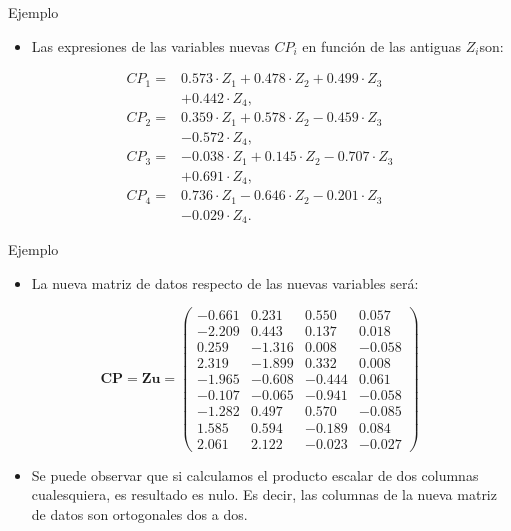 \documentclass[
  ignorenonframetext,
]{beamer}
\providecommand{\tightlist}{%
  \setlength{\itemsep}{0pt}\setlength{\parskip}{0pt}}
\begin{document}
\begin{frame}{Ejemplo}
\protect\hypertarget{ejemplo-13}{}
\begin{itemize}
\tightlist
\item
  Las expresiones de las variables nuevas \(CP_i\) en función de las
  antiguas \(Z_i\)son:
\end{itemize}

\[
\begin{array}{rl}
CP_1 = & 0.573\cdot Z_1 +0.478\cdot Z_2 +0.499\cdot Z_3\\ & +0.442 \cdot Z_4,
\\
CP_2 = & 0.359\cdot Z_1 + 0.578\cdot Z_2 -0.459 \cdot Z_3 \\ & -0.572 \cdot Z_4,
\\
CP_3 = & -0.038\cdot Z_1 +0.145 \cdot Z_2 -0.707\cdot Z_3 \\ &+0.691\cdot Z_4,
\\
CP_4 = & 0.736 \cdot Z_1 - 0.646\cdot Z_2 - 0.201\cdot Z_3 \\ & - 0.029 \cdot
Z_4.
\end{array}
\]
\end{frame}

\begin{frame}{Ejemplo}
\protect\hypertarget{ejemplo-14}{}
\begin{itemize}
\tightlist
\item
  La nueva matriz de datos respecto de las nuevas variables será:
\end{itemize}

\[
\mathbf{CP} = \mathbf{Z} \mathbf{u} =
\begin{pmatrix}
-0.661 & 0.231 & 0.550 & 0.057 \\
 -2.209 & 0.443 & 0.137 & 0.018 \\
 0.259 & -1.316 & 0.008 & -0.058 \\
 2.319 & -1.899 & 0.332 & 0.008 \\
 -1.965 & -0.608 & -0.444 & 0.061 \\
 -0.107 & -0.065 & -0.941 & -0.058 \\
 -1.282 & 0.497 & 0.570 & -0.085 \\
 1.585 & 0.594 & -0.189 & 0.084 \\
 2.061 & 2.122 & -0.023 & -0.027 
\end{pmatrix}
\]

\begin{itemize}
\tightlist
\item
  Se puede observar que si calculamos el producto escalar de dos
  columnas cualesquiera, es resultado es nulo. Es decir, las columnas de
  la nueva matriz de datos son ortogonales dos a dos.
\end{itemize}
\end{frame}
\end{document}
